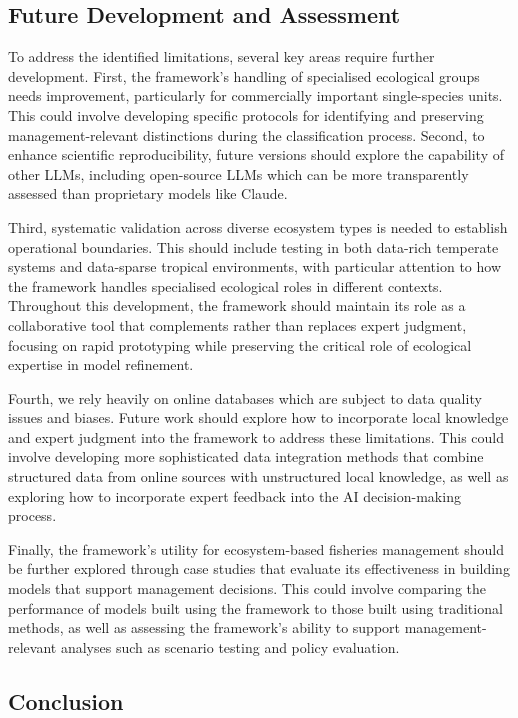 \subsection{Future Development and Assessment}

To address the identified limitations, several key areas require further development. First, the framework's handling of specialised ecological groups needs improvement, particularly for commercially important single-species units. This could involve developing specific protocols for identifying and preserving management-relevant distinctions during the classification process. Second, to enhance scientific reproducibility, future versions should explore the capability of other LLMs, including open-source LLMs which can be more transparently assessed than proprietary models like Claude.

Third, systematic validation across diverse ecosystem types is needed to establish operational boundaries. This should include testing in both data-rich temperate systems and data-sparse tropical environments, with particular attention to how the framework handles specialised ecological roles in different contexts. Throughout this development, the framework should maintain its role as a collaborative tool that complements rather than replaces expert judgment, focusing on rapid prototyping while preserving the critical role of ecological expertise in model refinement.

Fourth, we rely heavily on online databases which are subject to data quality issues and biases. Future work should explore how to incorporate local knowledge and expert judgment into the framework to address these limitations. This could involve developing more sophisticated data integration methods that combine structured data from online sources with unstructured local knowledge, as well as exploring how to incorporate expert feedback into the AI decision-making process.

Finally, the framework's utility for ecosystem-based fisheries management should be further explored through case studies that evaluate its effectiveness in building models that support management decisions. This could involve comparing the performance of models built using the framework to those built using traditional methods, as well as assessing the framework's ability to support management-relevant analyses such as scenario testing and policy evaluation.

\subsection{Conclusion}

